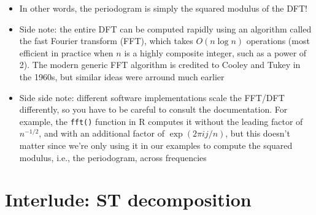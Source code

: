 \documentclass{article}
\begin{document}
\begin{itemize}
\item In other words, the periodogram is simply the squared modulus of the DFT! 

\item Side note: the entire DFT can be computed rapidly using an algorithm
  called the fast Fourier transform (FFT), which takes $O(n\log{n})$ operations 
  (most efficient in practice when $n$ is a highly composite integer, such as a
  power of 2). The modern generic FFT algorithm is credited to Cooley and Tukey
  in the 1960s, but similar ideas were arround much earlier   

\item Side side note: different software implementations scale the FFT/DFT 
  differently, so you have to be careful to consult the documentation. For
  example, the \verb|fft()| function in R computes it without the leading factor
  of $n^{-1/2}$, and with an additional factor of $\exp(2\pi i j/n)$, but this
  doesn't matter since we're only using it in our examples to compute the
  squared modulus, i.e., the periodogram, across frequencies
\end{itemize}

\section{Interlude: ST decomposition}
\end{document}

